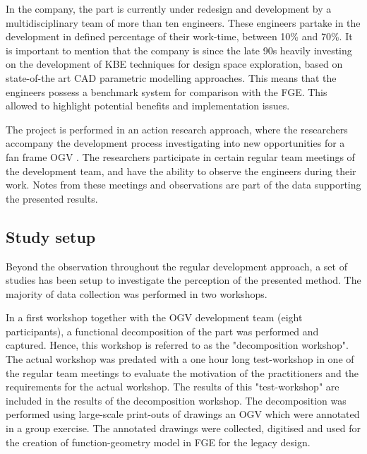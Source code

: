 \documentclass[preprints,article,accept,moreauthors,pdftex]{Definitions/mdpi}
\begin{document}
In the company, the part is currently under redesign and development by a multidisciplinary team of more than ten engineers.
These engineers partake in the development in defined percentage of their work-time, between 10\% and 70\%. It is important to mention that the company is since the late 90s heavily investing on the development of KBE techniques for design space exploration, based on state-of-the art CAD parametric modelling approaches. This means that the engineers possess a benchmark system for comparison with the FGE. This allowed to highlight potential benefits and implementation issues.    

The project is performed in an action research approach, where the researchers accompany the development process investigating into new opportunities for a fan frame \ac{OGV} \citep{Yin2006}.
The researchers participate in certain regular team meetings of the development team, and have the ability to observe the engineers during their work.
Notes from these meetings and observations are part of the data supporting the presented results.

\subsection{Study setup}
Beyond the observation throughout the regular development approach, a set of studies has been setup to investigate the perception of the presented method.
The majority of data collection was performed in two workshops.


In a first workshop together with the \ac{OGV} development team (eight participants), a functional decomposition of the part was performed and captured.
Hence, this workshop is referred to as the "decomposition workshop".
The actual workshop was predated with a one hour long test-workshop in one of the regular team meetings to evaluate the motivation of the practitioners and the requirements for the actual workshop.
The results of this "test-workshop" are included in the results of the decomposition workshop.
The decomposition was performed using large-scale print-outs of drawings an \ac{OGV} which were annotated in a group exercise.
The annotated drawings were collected, digitised and used for the creation of function-geometry model in \ac{FGE} for the legacy design.
\end{document}
